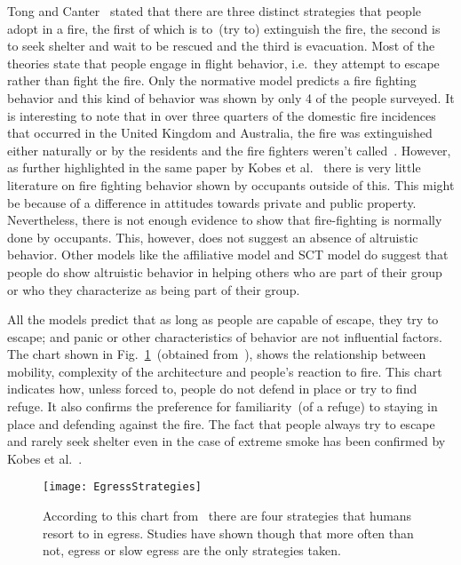 Tong and Canter~\cite{Tong:1985wn} stated that there are three distinct strategies that people adopt in a fire, the first of which is to~(try to) extinguish the fire, the second is to seek shelter and wait to be rescued and the third is evacuation. Most of the theories state that people engage in flight behavior, i.e.\ they attempt to escape rather than fight the fire. Only the normative model predicts a fire fighting behavior and this kind of behavior was shown by only 4 of the people surveyed. It is interesting to note that in over three quarters of the domestic fire incidences that occurred in the United Kingdom and Australia, the fire was extinguished either naturally or by the residents and the fire fighters weren't called~\cite{Kobes:2009jx}. However, as further highlighted in the same paper by Kobes et al.~\cite{Kobes:2009jx} there is very little literature on fire fighting behavior shown by occupants outside of this. This might be because of a difference in attitudes towards private and public property. Nevertheless, there is not enough evidence to show that fire-fighting is normally done by occupants. This, however, does not suggest an absence of altruistic behavior. Other models like the affiliative model and SCT model do suggest that people do show altruistic behavior in helping others who are part of their group or who they characterize as being part of their group.

All the models predict that as long as people are capable of escape, they try to escape; and panic or other characteristics of behavior are not influential factors. The chart shown in Fig.~\ref{fig:EgressAge}~(obtained from~\cite{Klupfel:2005to}), shows the relationship between mobility, complexity of the architecture and people's reaction to fire. This chart indicates how, unless forced to, people do not defend in place or try to find refuge. It also confirms the preference for familiarity~(of a refuge) to staying in place and defending against the fire. The fact that people always try to escape and rarely seek shelter even in the case of extreme smoke has been confirmed by Kobes et al.~\cite{Kobes:2009jx}.

\begin{figure}[!htb]
\centering
\texttt{[image: EgressStrategies]}
\caption[Strategies for Egress]{According to this chart from~\cite{Klupfel:2005to} there are four strategies that humans resort to in egress. Studies have shown though that more often than not, egress or slow egress are the only strategies taken.}
\label{fig:EgressAge}
\end{figure}

